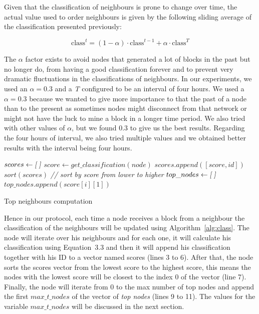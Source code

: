 Given that the classification of neighbours is prone to change over time, the actual value used to order neighbours is given by the following sliding average of the classification presented previously:

\begin{equation} \mbox{class}^t = (1-\alpha) \cdot \mbox{class}^{t-1} + \alpha \cdot \mbox{class}^{T} \end{equation}

The $\alpha$ factor exists to avoid nodes that generated a lot of blocks in the past but no longer do, from having a good classification forever and to prevent very dramatic fluctuations in the classifications of neighbours. In our experiments, we used an $\alpha=0.3$ and a \textit{T} configured to be an interval of four hours. We used a $\alpha=0.3$ because we wanted to give more importance to that the past of a node than to the present as sometimes nodes might disconnect from that network or might not have the luck to mine a block in a longer time period. We also tried with other values of $\alpha$, but we found 0.3 to give us the best results. Regarding the four hours of interval, we also tried multiple values and we obtained better results with the interval being four hours.

\begin{algorithm}
\begin{algorithmic}[1]
\State $scores \gets \textsl{[ ]}$
  \State $score \gets get\_classification(node)$
  \State $scores.append([score, id])$
\EndFor
\State $sort(scores)$ \textit{// sort by score from lower to higher}
\State $top\_nodes \gets \textsl{[ ]}$
  \State $top\_nodes.append(score[i][1])$
\EndFor
\EndFunction
\end{algorithmic}
\caption{Top neighbours computation}
\label{alg:class}
\end{algorithm}

Hence in our protocol, each time a node receives a block from a neighbour the classification of the neighbours will be updated using Algorithm~\ref{alg:class}. The node will iterate over his neighbours and for each one, it will calculate his classification using Equation~3.3 and then it will append his classification together with his ID to a vector named scores (lines 3 to 6). After that, the node sorts the scores vector from the lowest score to the highest score, this means the nodes with the lowest score will be closest to the index 0 of the vector (line 7). Finally, the node will iterate from 0 to the max number of top nodes and append the first $max\_t\_nodes$ of the vector of \textsl{top nodes} (lines 9 to 11). The values for the variable $max\_t\_nodes$ will be discussed in the next section.

